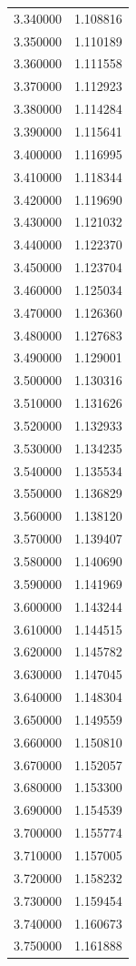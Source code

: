 \begin{tabular}{rr}
3.340000 & 1.108816 \\
3.350000 & 1.110189 \\
3.360000 & 1.111558 \\
3.370000 & 1.112923 \\
3.380000 & 1.114284 \\
3.390000 & 1.115641 \\
3.400000 & 1.116995 \\
3.410000 & 1.118344 \\
3.420000 & 1.119690 \\
3.430000 & 1.121032 \\
3.440000 & 1.122370 \\
3.450000 & 1.123704 \\
3.460000 & 1.125034 \\
3.470000 & 1.126360 \\
3.480000 & 1.127683 \\
3.490000 & 1.129001 \\
3.500000 & 1.130316 \\
3.510000 & 1.131626 \\
3.520000 & 1.132933 \\
3.530000 & 1.134235 \\
3.540000 & 1.135534 \\
3.550000 & 1.136829 \\
3.560000 & 1.138120 \\
3.570000 & 1.139407 \\
3.580000 & 1.140690 \\
3.590000 & 1.141969 \\
3.600000 & 1.143244 \\
3.610000 & 1.144515 \\
3.620000 & 1.145782 \\
3.630000 & 1.147045 \\
3.640000 & 1.148304 \\
3.650000 & 1.149559 \\
3.660000 & 1.150810 \\
3.670000 & 1.152057 \\
3.680000 & 1.153300 \\
3.690000 & 1.154539 \\
3.700000 & 1.155774 \\
3.710000 & 1.157005 \\
3.720000 & 1.158232 \\
3.730000 & 1.159454 \\
3.740000 & 1.160673 \\
3.750000 & 1.161888 \\

\end{tabular}
